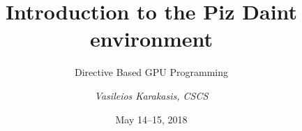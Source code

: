 \documentclass[12pt,aspectratio=169]{beamer}
\author{\emph{Vasileios Karakasis, CSCS}}
\title{Introduction to the Piz Daint environment}
\subtitle{Directive Based GPU Programming}
\date{May 14--15, 2018}
\begin{document}
\cscstitle







\end{document}
